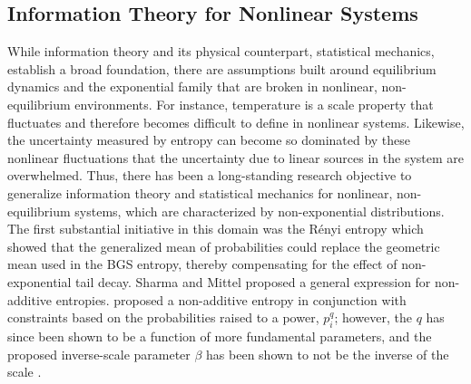 \documentclass[twoside,11pt]{article}
\begin{document}
\subsection{Information Theory for Nonlinear Systems}

While information theory and its physical counterpart, statistical mechanics, establish a broad foundation, there are assumptions built around equilibrium dynamics and the exponential family that are broken in nonlinear, non-equilibrium environments. For instance, temperature is a scale property that fluctuates and therefore becomes difficult to define in nonlinear systems. Likewise, the uncertainty measured by entropy can become so dominated by these nonlinear fluctuations that the uncertainty due to linear sources in the system are overwhelmed. Thus, there has been a long-standing research objective to generalize information theory and statistical mechanics for nonlinear, non-equilibrium systems, which are characterized by non-exponential distributions. The first substantial initiative in this domain was the Rényi entropy \citep{renyiMeasuresEntropyInformation1961, bashkirovRenyiEntropyStatistical2006} which showed that the generalized mean of probabilities could replace the geometric mean used in the BGS entropy, thereby compensating for the effect of non-exponential tail decay. Sharma and Mittel \citep{sharmaNewNonadditiveMeasures1975, nielsenClosedformExpressionSharma2012} proposed a general expression for non-additive entropies. \cite{tsallisPossibleGeneralizationBoltzmannGibbs1988} proposed a non-additive entropy in conjunction with constraints based on the probabilities raised to a power, $p_i^q$; however, the $q$ has since been shown to be a function of more fundamental parameters, and the proposed inverse-scale parameter $\beta$ has been shown to not be the inverse of the scale \cite{nelsonOpenProblemsNonextensive2024}. 
\end{document}
